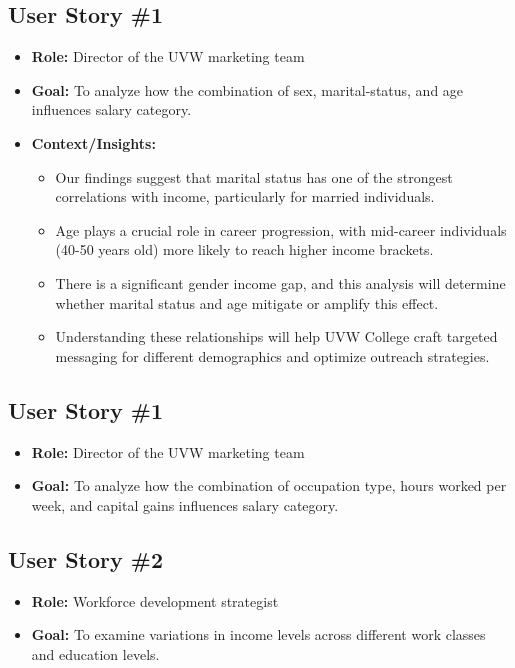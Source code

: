 \documentclass[journal,onecolumn]{IEEEtran}
\begin{document}
\subsection{User Story \#1}
\begin{itemize}
    \item \textbf{Role:} Director of the UVW marketing team
    \item \textbf{Goal:} To analyze how the combination of sex, marital-status, and age influences salary category.
    \item \textbf{Context/Insights:}
    \begin{itemize}
        \item Our findings suggest that marital status has one of the strongest correlations with income, particularly for married individuals.
        \item Age plays a crucial role in career progression, with mid-career individuals (40-50 years old) more likely to reach higher income brackets.
        \item There is a significant gender income gap, and this analysis will determine whether marital status and age mitigate or amplify this effect.
        \item Understanding these relationships will help UVW College craft targeted messaging for different demographics and optimize outreach strategies.
    \end{itemize}

\end{itemize}

\subsection{User Story \#1}
\begin{itemize}
    \item \textbf{Role:} Director of the UVW marketing team
    \item \textbf{Goal:} To analyze how the combination of occupation type, hours worked per week, and capital gains influences salary category.
\end{itemize}

\subsection{User Story \#2}
\begin{itemize}
    \item \textbf{Role:} Workforce development strategist
    \item \textbf{Goal:} To examine variations in income levels across different work classes and education levels.
\end{itemize}
\end{document}
